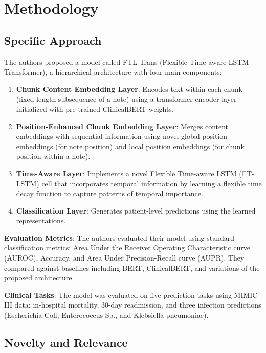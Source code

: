 \documentclass[10pt,letterpaper,twocolumn]{article}
\begin{document}
\section{Methodology}

\subsection{Specific Approach}

The authors proposed a model called FTL-Trans (Flexible Time-aware LSTM Transformer), a hierarchical architecture with four main components:

\begin{enumerate}[leftmargin=*]
    \item \textbf{Chunk Content Embedding Layer}: Encodes text within each chunk (fixed-length subsequence of a note) using a transformer-encoder layer initialized with pre-trained ClinicalBERT weights.
    
    \item \textbf{Position-Enhanced Chunk Embedding Layer}: Merges content embeddings with sequential information using novel global position embeddings (for note position) and local position embeddings (for chunk position within a note).
    
    \item \textbf{Time-Aware Layer}: Implements a novel Flexible Time-aware LSTM (FT-LSTM) cell that incorporates temporal information by learning a flexible time decay function to capture patterns of temporal importance.
    
    \item \textbf{Classification Layer}: Generates patient-level predictions using the learned representations.
\end{enumerate}

\textbf{Evaluation Metrics}: The authors evaluated their model using standard classification metrics: Area Under the Receiver Operating Characteristic curve (AUROC), Accuracy, and Area Under Precision-Recall curve (AUPR). They compared against baselines including BERT, ClinicalBERT, and variations of the proposed architecture.

\textbf{Clinical Tasks}: The model was evaluated on five prediction tasks using MIMIC-III data\cite{johnson2016mimic}: in-hospital mortality, 30-day readmission, and three infection predictions (Escherichia Coli, Enterococcus Sp., and Klebsiella pneumoniae).

\subsection{Novelty and Relevance}
\end{document}
